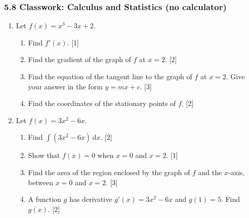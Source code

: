 \documentclass[12pt, twoside]{article}
\begin{document}
\subsubsection*{5.8 Classwork: Calculus and Statistics (no calculator)}

\begin{enumerate}[itemsep=0.2cm]

\item Let $f(x) = x^3 - 3x + 2$.

\begin{enumerate}[itemsep=0.15cm]
  \item Find $f'(x)$. \hfill [1]
  \item Find the gradient of the graph of $f$ at $x = 2$. \hfill [2]
  \item Find the equation of the tangent line to the graph of $f$ at $x = 2$.
        Give your answer in the form $y = mx + c$. \hfill [3]
  \item Find the coordinates of the stationary points of $f$. \hfill [2]
\end{enumerate}


\newpage

\item Let $f(x) = 3x^2 - 6x$.

\begin{enumerate}[itemsep=0.15cm]
  \item Find $\displaystyle\int (3x^2 - 6x)\,\mathrm{d}x$. \hfill [2]
  \item Show that $f(x) = 0$ when $x = 0$ and $x = 2$. \hfill [1]
  \item Find the area of the region enclosed by the graph of $f$
        and the $x$-axis, between $x = 0$ and $x = 2$. \hfill [3]
  \item A function $g$ has derivative $g'(x) = 3x^2 - 6x$ and
        $g(1) = 5$. Find $g(x)$. \hfill [2]
\end{enumerate}



\end{enumerate}
\end{document}
